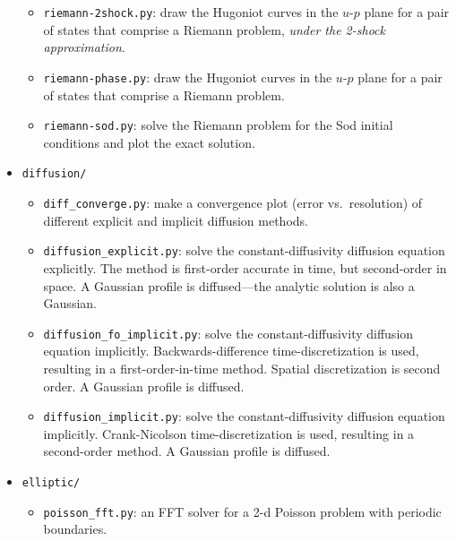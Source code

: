 \begin{itemize}
\begin{itemize}
  \item {\tt riemann-2shock.py}: draw the Hugoniot curves in the $u$-$p$
    plane for a pair of states that comprise a Riemann problem, {\em under
      the 2-shock approximation}.

  \item {\tt riemann-phase.py}: draw the Hugoniot curves in the
    $u$-$p$ plane for a pair of states that comprise a Riemann
    problem.

  \item {\tt riemann-sod.py}: solve the Riemann problem for the Sod
    initial conditions and plot the exact solution.

  \end{itemize}

\item {\tt diffusion/}

  \begin{itemize}
    \item {\tt diff\_converge.py}: make a convergence plot (error
      vs.\ resolution) of different explicit and implicit diffusion
      methods.

    \item {\tt diffusion\_explicit.py}: solve the constant-diffusivity
      diffusion equation explicitly.  The method is first-order
      accurate in time, but second-order in space.  A Gaussian profile
      is diffused---the analytic solution is also a Gaussian.

    \item {\tt diffusion\_fo\_implicit.py}: solve the
      constant-diffusivity diffusion equation implicitly.
      Backwards-difference time-discretization is used, resulting in a
      first-order-in-time method.  Spatial discretization is second
      order.  A Gaussian profile is diffused.

    \item {\tt diffusion\_implicit.py}: solve the constant-diffusivity
      diffusion equation implicitly.  Crank-Nicolson time-discretization
      is used, resulting in a second-order method.  A Gaussian profile
      is diffused.

  \end{itemize}
  
\item {\tt elliptic/}

  \begin{itemize}
    \item {\tt poisson\_fft.py}: an FFT solver for a 2-d Poisson problem
    with periodic boundaries.
  \end{itemize}


\end{itemize}
